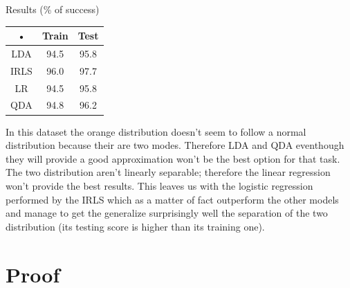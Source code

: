 \documentclass[a4paper]{article}
\begin{document}
\begin{minipage}[c]{0,35\textwidth}
Results (\% of success)\\
\begin{tabular}{|c|c|c|}
\hline 
• & Train & Test \\ 
\hline 
LDA & 94.5 & 95.8 \\ 
\hline 
IRLS & 96.0 & 97.7 \\ 
\hline 
LR & 94.5 & 95.8 \\ 
\hline 
QDA & 94.8 & 96.2 \\ 
\hline 
\end{tabular} 
\end{minipage}
\begin{minipage}{0,6\textwidth}
In this dataset the orange distribution doesn't seem to follow a normal distribution because their are two modes. Therefore LDA and QDA eventhough they will provide a good approximation won't be the best option for that task. The two distribution aren't linearly separable; therefore the linear regression won't provide the best results. This leaves us with the logistic regression performed by the IRLS which as a matter of fact outperform the other models and manage to get the generalize surprisingly well the separation of the two distribution (its testing score is higher than its training one).
\end{minipage}
\newpage
\section{Proof}
\end{document}
